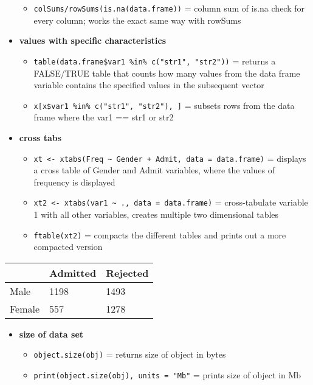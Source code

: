 \documentclass[
]{article}
\providecommand{\tightlist}{%
  \setlength{\itemsep}{0pt}\setlength{\parskip}{0pt}}
\begin{document}
\begin{itemize}
  \begin{itemize}
  \tightlist
  \item
    \texttt{colSums/rowSums(is.na(data.frame))} = column sum of is.na
    check for every column; works the exact same way with rowSums
  \end{itemize}
\item
  \textbf{values with specific characteristics}

  \begin{itemize}
  \tightlist
  \item
    \texttt{table(data.frame\$var1\ \%in\%\ c("str1",\ "str2"))} =
    returns a FALSE/TRUE table that counts how many values from the data
    frame variable contains the specified values in the subsequent
    vector
  \item
    \texttt{x{[}x\$var1\ \%in\%\ c("str1",\ "str2"),\ {]}} = subsets
    rows from the data frame where the var1 == str1 or str2
  \end{itemize}
\item
  \textbf{cross tabs}

  \begin{itemize}
  \tightlist
  \item
    \texttt{xt\ \textless{}-\ xtabs(Freq\ \textasciitilde{}\ Gender\ +\ Admit,\ data\ =\ data.frame)}
    = displays a cross table of Gender and Admit variables, where the
    values of frequency is displayed
  \item
    \texttt{xt2\ \textless{}-\ xtabs(var1\ \textasciitilde{}\ .,\ data\ =\ data.frame)}
    = cross-tabulate variable 1 with all other variables, creates
    multiple two dimensional tables
  \item
    \texttt{ftable(xt2)} = compacts the different tables and prints out
    a more compacted version
  \end{itemize}
\end{itemize}

\begin{longtable}[]{@{}lll@{}}
\toprule
& Admitted & Rejected\tabularnewline
\midrule
\endhead
Male & 1198 & 1493\tabularnewline
Female & 557 & 1278\tabularnewline
\bottomrule
\end{longtable}

\begin{itemize}
\tightlist
\item
  \textbf{size of data set}

  \begin{itemize}
  \tightlist
  \item
    \texttt{object.size(obj)} = returns size of object in bytes
  \item
    \texttt{print(object.size(obj),\ units\ =\ "Mb"} = prints size of
    object in Mb
  \end{itemize}
\end{itemize}
\end{document}
